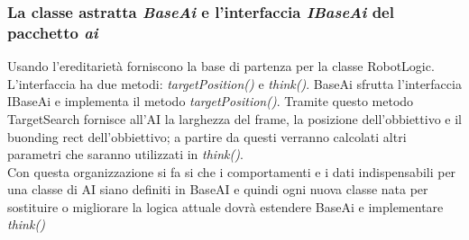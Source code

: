 \subsubsection{La classe astratta \emph{BaseAi} e l'interfaccia \emph{IBaseAi} del pacchetto \emph{ai}}
Usando l'ereditarietà forniscono la base di partenza per la classe RobotLogic.\\
L'interfaccia ha due metodi: \emph{targetPosition()} e \emph{think()}.
BaseAi sfrutta l'interfaccia IBaseAi e implementa il metodo \emph{targetPosition()}. 
Tramite questo metodo TargetSearch fornisce all'AI la larghezza del frame, la posizione 
dell'obbiettivo e il buonding rect dell'obbiettivo; a partire da questi verranno 
calcolati altri parametri che saranno utilizzati in \emph{think()}.\\
Con questa organizzazione si fa si che i comportamenti e i dati indispensabili per una classe di 
AI siano definiti in BaseAI e quindi ogni nuova classe nata per sostituire o migliorare
 la logica attuale dovrà estendere BaseAi e implementare \emph{think()} 


